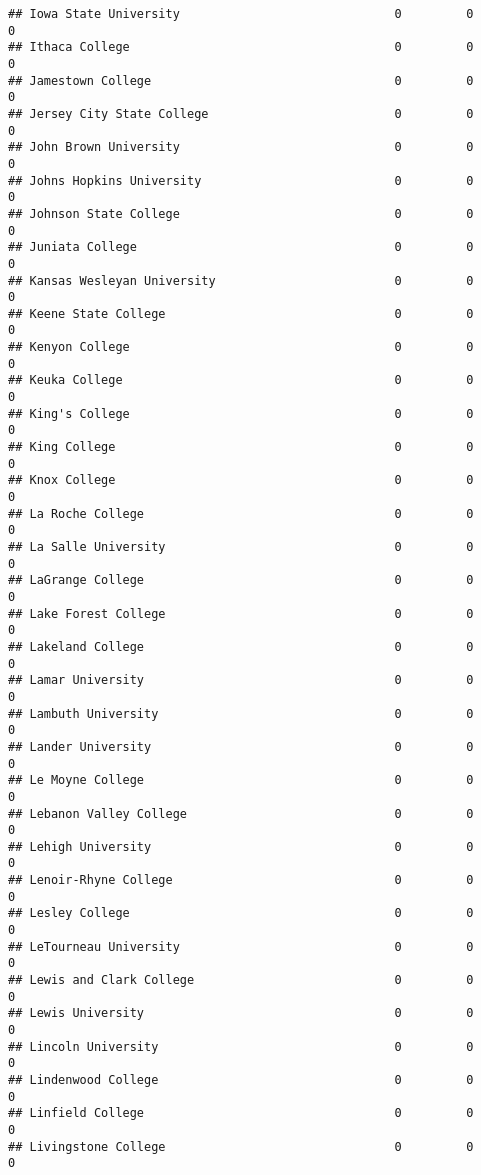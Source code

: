 \documentclass[
]{article}
\begin{document}
\begin{verbatim}
## Iowa State University                              0         0         0
## Ithaca College                                     0         0         0
## Jamestown College                                  0         0         0
## Jersey City State College                          0         0         0
## John Brown University                              0         0         0
## Johns Hopkins University                           0         0         0
## Johnson State College                              0         0         0
## Juniata College                                    0         0         0
## Kansas Wesleyan University                         0         0         0
## Keene State College                                0         0         0
## Kenyon College                                     0         0         0
## Keuka College                                      0         0         0
## King's College                                     0         0         0
## King College                                       0         0         0
## Knox College                                       0         0         0
## La Roche College                                   0         0         0
## La Salle University                                0         0         0
## LaGrange College                                   0         0         0
## Lake Forest College                                0         0         0
## Lakeland College                                   0         0         0
## Lamar University                                   0         0         0
## Lambuth University                                 0         0         0
## Lander University                                  0         0         0
## Le Moyne College                                   0         0         0
## Lebanon Valley College                             0         0         0
## Lehigh University                                  0         0         0
## Lenoir-Rhyne College                               0         0         0
## Lesley College                                     0         0         0
## LeTourneau University                              0         0         0
## Lewis and Clark College                            0         0         0
## Lewis University                                   0         0         0
## Lincoln University                                 0         0         0
## Lindenwood College                                 0         0         0
## Linfield College                                   0         0         0
## Livingstone College                                0         0         0

\end{verbatim}
\end{document}
